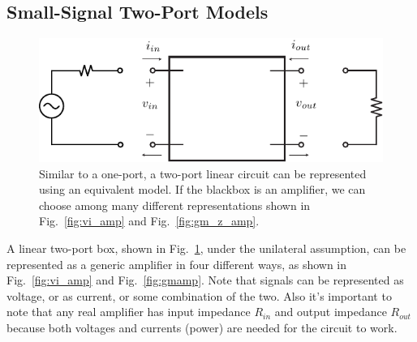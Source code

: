 \subsection{Small-Signal Two-Port Models}
\begin{figure}[tb]
\centering
\includegraphics[scale=1]{2port_ss}
\caption{Similar to a one-port, a two-port linear circuit can be represented using an equivalent model.  If the blackbox is an amplifier, we can choose among many different representations shown in Fig.~\ref{fig:vi_amp} and Fig.~\ref{fig:gm_z_amp}.}
\label{fig:2port_ss}
\end{figure}
A linear two-port box, shown in Fig.~\ref{fig:2port_ss}, under the unilateral assumption, can be represented as a generic amplifier in four different ways, as shown in Fig.~\ref{fig:vi_amp} and Fig.~\ref{fig:gmamp}.  Note that signals can be represented as voltage, or as current, or some combination of the two.  Also it's important to note that any real amplifier has input impedance $R_{in}$ and output impedance $R_{out}$ because both voltages and currents (power) are needed for the circuit to work.  
